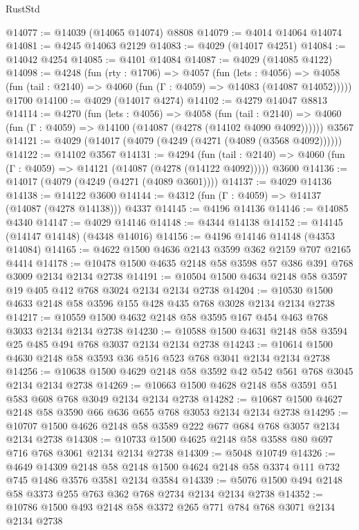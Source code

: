 \begin{lexlean}{RustStd}
\begin{coremodule}
@14077 := @14039 (@14065 @14074) @8808
@14079 := @4014 @14064 @14074
@14081 := @4245 @14063 @2129
@14083 := @4029 (@14017 @4251)
@14084 := @14042 @4254
@14085 := @4101 @14084
@14087 := @4029 (@14085 @4122)
@14098 := @4248
    (fun (rty : @1706) =>
    @4057
      (fun (lets : @4056) =>
      @4058 (fun (tail : @2140) => @4060 (fun (Γ : @4059) => @14083 (@14087 @14052)))))
    @1700
@14100 := @4029 (@14017 @4274)
@14102 := @4279 @14047 @8813
@14114 := @4270
    (fun (lets : @4056) =>
    @4058
      (fun (tail : @2140) =>
      @4060 (fun (Γ : @4059) => @14100 (@14087 (@4278 (@14102 @4090 @4092))))))
    @3567
@14121 := @4029 (@14017 (@4079 (@4249 (@4271 (@4089 (@3568 @4092))))))
@14122 := @14102 @3567
@14131 := @4294
    (fun (tail : @2140) => @4060 (fun (Γ : @4059) => @14121 (@14087 (@4278 (@14122 @4092)))))
    @3600
@14136 := @14017 (@4079 (@4249 (@4271 (@4089 @3601))))
@14137 := @4029 @14136
@14138 := @14122 @3600
@14144 := @4312 (fun (Γ : @4059) => @14137 (@14087 (@4278 @14138))) @4337
@14145 := @4196 @14136
@14146 := @14085 @4340
@14147 := @4029 @14146
@14148 := @4344 @14138
@14152 := @14145 (@14147 @14148) (@4348 @14016)
@14156 := @4196 @14146 @14148 (@4353 @14084)
@14165 := @4622 @1500 @4636 @2143 @3599 @362 @2159 @707 @2165 @4414
@14178 := @10478 @1500 @4635 @2148 @58 @3598 @57 @386 @391 @768 @3009 @2134 @2134 @2738
@14191 := @10504 @1500 @4634 @2148 @58 @3597 @19 @405 @412 @768 @3024 @2134 @2134 @2738
@14204 := @10530 @1500 @4633 @2148 @58 @3596 @155 @428 @435 @768 @3028 @2134 @2134 @2738
@14217 := @10559 @1500 @4632 @2148 @58 @3595 @167 @454 @463 @768 @3033 @2134 @2134 @2738
@14230 := @10588 @1500 @4631 @2148 @58 @3594 @25 @485 @494 @768 @3037 @2134 @2134 @2738
@14243 := @10614 @1500 @4630 @2148 @58 @3593 @36 @516 @523 @768 @3041 @2134 @2134 @2738
@14256 := @10638 @1500 @4629 @2148 @58 @3592 @42 @542 @561 @768 @3045 @2134 @2134 @2738
@14269 := @10663 @1500 @4628 @2148 @58 @3591 @51 @583 @608 @768 @3049 @2134 @2134 @2738
@14282 := @10687 @1500 @4627 @2148 @58 @3590 @66 @636 @655 @768 @3053 @2134 @2134 @2738
@14295 := @10707 @1500 @4626 @2148 @58 @3589 @222 @677 @684 @768 @3057 @2134 @2134 @2738
@14308 := @10733 @1500 @4625 @2148 @58 @3588 @80 @697 @716 @768 @3061 @2134 @2134 @2738
@14309 := @5048 @10749
@14326 := @4649
    @14309
    @2148
    @58
    @2148
    @1500
    @4624
    @2148
    @58
    @3374
    @111
    @732
    @745
    @1486
    @3576
    @3581
    @2134
    @3584
@14339 := @5076 @1500 @494 @2148 @58 @3373 @255 @763 @362 @768 @2734 @2134 @2134 @2738
@14352 := @10786 @1500 @493 @2148 @58 @3372 @265 @771 @784 @768 @3071 @2134 @2134 @2738

\end{coremodule}
\end{lexlean}
